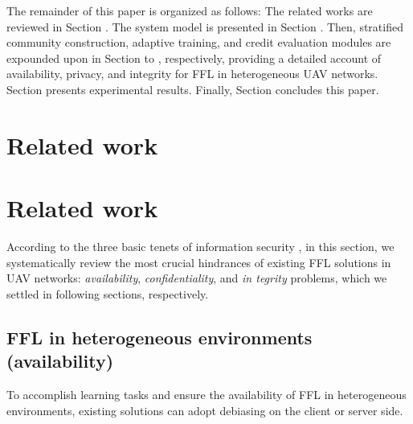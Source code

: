 \documentclass[lettersize,journal]{IEEEtran}
\begin{document}
The remainder of this paper is organized as follows: The related works are reviewed in Section \uppercase\expandafter{}. The system model is presented in Section \uppercase\expandafter{}. Then, stratified community construction, adaptive training, and credit evaluation modules are expounded upon in Section \uppercase\expandafter{} to \uppercase\expandafter{}, respectively, providing a detailed account of availability, privacy, and integrity for FFL in heterogeneous UAV networks. Section \uppercase\expandafter{} presents experimental results. Finally, Section \uppercase\expandafter{} concludes this paper. %



\section{Related work}



\section{Related work}



According to the three basic tenets of information security \cite{zhou2021augmented-globecom}, in this section, we systematically review the most crucial hindrances of existing FFL solutions in UAV networks: \textit{availability}, \textit{confidentiality}, and \textit{in tegrity} problems, which we settled in following sections, respectively. 
\subsection{FFL in heterogeneous environments (availability)}
To accomplish learning tasks and ensure the availability of FFL in heterogeneous environments, existing solutions can adopt debiasing on the client or server side.
\end{document}
